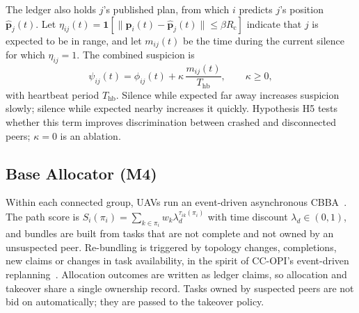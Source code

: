\documentclass[journal]{IEEEtran}
\newcommand{\Rc}{R_{\mathrm{c}}}
\newcommand{\ind}{\mathbf{1}}
\begin{document}
The ledger also holds $j$'s published plan, from which $i$ predicts $j$'s position $\hat{\mathbf{p}}_j(t)$. Let $\eta_{ij}(t)=\ind[\|\mathbf{p}_i(t)-\hat{\mathbf{p}}_j(t)\|\le\beta\Rc]$ indicate that $j$ is expected to be in range, and let $m_{ij}(t)$ be the time during the current silence for which $\eta_{ij}=1$. The combined suspicion is
\begin{equation}
\psi_{ij}(t)=\phi_{ij}(t)+\kappa\,\frac{m_{ij}(t)}{T_{\mathrm{hb}}},\qquad\kappa\ge 0,\label{eq:psi}
\end{equation}
with heartbeat period $T_{\mathrm{hb}}$. Silence while expected far away increases suspicion slowly; silence while expected nearby increases it quickly. Hypothesis H5 tests whether this term improves discrimination between crashed and disconnected peers; $\kappa=0$ is an ablation.

\subsection{Base Allocator (M4)}
Within each connected group, UAVs run an event-driven asynchronous CBBA~\cite{R02_choi2009,R03_johnson2011}. The path score is $S_i(\pi_i)=\sum_{k\in\pi_i}w_k\lambda_d^{\tau_{ik}(\pi_i)}$ with time discount $\lambda_d\in(0,1)$, and bundles are built from tasks that are not complete and not owned by an unsuspected peer. Re-bundling is triggered by topology changes, completions, new claims or changes in task availability, in the spirit of CC-OPI's event-driven replanning~\cite{R66_liu2026}. Allocation outcomes are written as ledger claims, so allocation and takeover share a single ownership record. Tasks owned by suspected peers are not bid on automatically; they are passed to the takeover policy.
\end{document}
